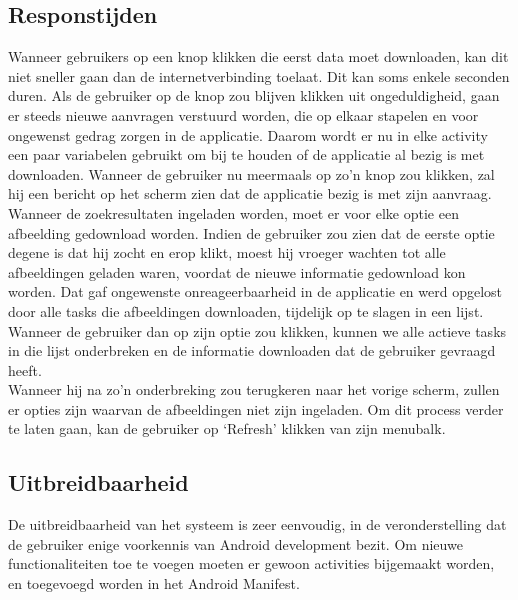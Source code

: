 \documentclass[11pt,a4paper]{article}
\begin{document}
	\subsection{Responstijden}
	\label{sec:responsetijden}
	Wanneer gebruikers op een knop klikken die eerst data moet downloaden, kan dit niet sneller gaan dan de internetverbinding toelaat. Dit kan soms enkele seconden duren. Als de gebruiker op de knop zou blijven klikken uit ongeduldigheid, gaan er steeds nieuwe aanvragen verstuurd worden, die op elkaar stapelen en voor ongewenst gedrag zorgen in de applicatie. Daarom wordt er nu in elke activity een paar variabelen gebruikt om bij te houden of de applicatie al bezig is met downloaden. Wanneer de gebruiker nu meermaals op zo'n knop zou klikken, zal hij een bericht op het scherm zien dat de applicatie bezig is met zijn aanvraag. \\
	Wanneer de zoekresultaten ingeladen worden, moet er voor elke optie een afbeelding gedownload worden. Indien de gebruiker zou zien dat de eerste optie degene is dat hij zocht en erop klikt, moest hij vroeger wachten tot alle afbeeldingen geladen waren, voordat de nieuwe informatie gedownload kon worden. Dat gaf ongewenste onreageerbaarheid in de applicatie en werd opgelost door alle tasks die afbeeldingen downloaden, tijdelijk op te slagen in een lijst. Wanneer de gebruiker dan op zijn optie zou klikken, kunnen we alle actieve tasks in die lijst onderbreken en de informatie downloaden dat de gebruiker gevraagd heeft. \\
	Wanneer hij na zo'n onderbreking zou terugkeren naar het vorige scherm, zullen er opties zijn waarvan de afbeeldingen niet zijn ingeladen. Om dit process verder te laten gaan, kan de gebruiker op `Refresh' klikken van zijn menubalk.
	
	\subsection{Uitbreidbaarheid}
	\label{sec:Uitbreidbaarheid}
	De uitbreidbaarheid van het systeem is zeer eenvoudig, in de veronderstelling dat de gebruiker  enige voorkennis van Android development bezit. Om nieuwe functionaliteiten toe te voegen moeten er gewoon activities bijgemaakt worden, en toegevoegd worden in het Android Manifest.\\
	
\end{document}
